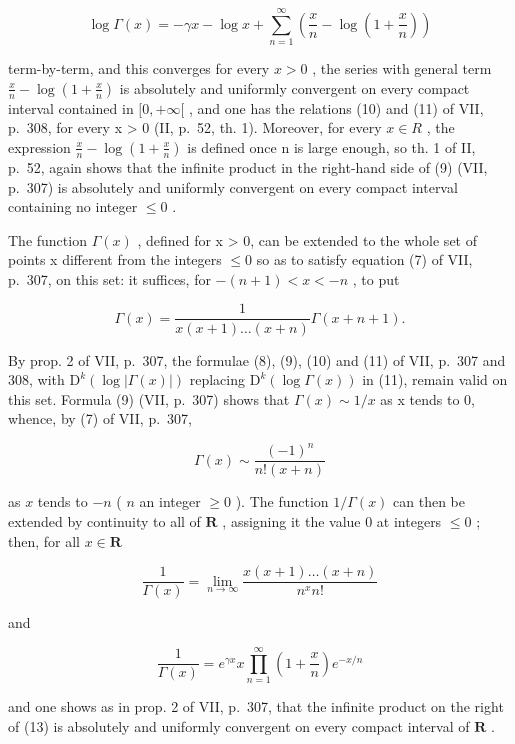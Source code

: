 \[
\log \Gamma (x) = - \gamma x - \log x + \sum_ {n = 1} ^ {\infty} \left(\frac {x}{n} - \log \left(1 + \frac {x}{n}\right)\right)
\]

term-by-term, and this converges for every \(x > 0\) , the series with general term \(\frac{x}{n} - \log \left(1 + \frac{x}{n}\right)\) is absolutely and uniformly convergent on every compact interval contained in \([0, +\infty[\) , and one has the relations (10) and (11) of VII, p.~308, for every x \textgreater{} 0 (II, p.~52, th. 1). Moreover, for every \(x \in R\) , the expression \(\frac{x}{n} - \log\left(1 + \frac{x}{n}\right)\) is defined once n is large enough, so th. 1 of II, p.~52, again shows that the infinite product in the right-hand side of (9) (VII, p.~307) is absolutely and uniformly convergent on every compact interval containing no integer \(\leqslant 0\) .

The function \(\Gamma(x)\) , defined for x \textgreater{} 0, can be extended to the whole set of points x different from the integers \(\leqslant 0\) so as to satisfy equation (7) of VII, p.~307, on this set: it suffices, for \(-(n + 1) < x < -n\) , to put

\[
\Gamma (x) = \frac {1}{x (x + 1) \ldots (x + n)} \Gamma (x + n + 1).
\]

By prop. 2 of VII, p.~307, the formulae (8), (9), (10) and (11) of VII, p.~307 and 308, with \(\mathrm{D}^{k}(\log|\Gamma(x)|)\) replacing \(\mathrm{D}^{k}(\log\Gamma(x))\) in (11), remain valid on this set. Formula (9) (VII, p.~307) shows that \(\Gamma(x)\sim1/x\) as x tends to 0, whence, by (7) of VII, p.~307,

\[
\Gamma (x) \sim \frac {(- 1) ^ {n}}{n ! (x + n)}
\]

as \(x\) tends to \(-n\) ( \(n\) an integer \(\geqslant 0\) ). The function \(1 / \Gamma(x)\) can then be extended by continuity to all of \(\mathbf{R}\) , assigning it the value 0 at integers \(\leqslant 0\) ; then, for all \(x \in \mathbf{R}\)

\[
\frac {1}{\Gamma (x)} = \lim _ {n \rightarrow \infty} \frac {x (x + 1) \dots (x + n)}{n ^ {x} n !}\tag{12}
\]

and

\[
\frac {1}{\Gamma (x)} = e ^ {\gamma x} x \prod_ {n = 1} ^ {\infty} \left(1 + \frac {x}{n}\right) e ^ {- x / n}\tag{13}
\]

and one shows as in prop. 2 of VII, p.~307, that the infinite product on the right of (13) is absolutely and uniformly convergent on every compact interval of \(\mathbf{R}\) .

